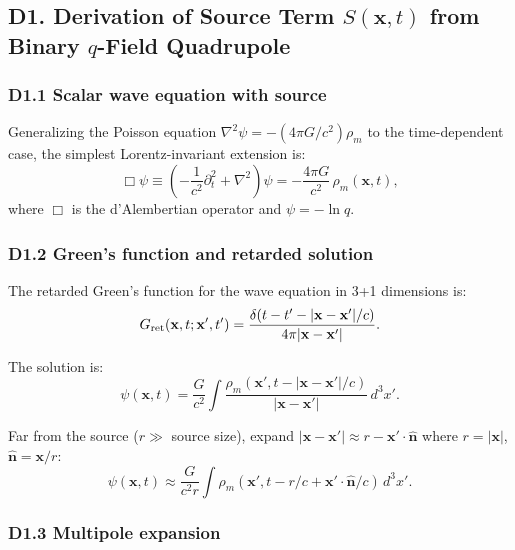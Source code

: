 \documentclass[reprint]{revtex4-2}
\begin{document}
\subsection{D1. Derivation of Source Term $S(\mathbf{x},t)$ from Binary $q$-Field Quadrupole}

\subsubsection{D1.1 Scalar wave equation with source}

Generalizing the Poisson equation $\nabla^2\psi = -(4\pi G/c^2)\rho_m$ to the time-dependent case, the simplest Lorentz-invariant extension is:
\begin{equation}
\Box\psi \equiv \left(-\frac{1}{c^2}\partial_t^2 + \nabla^2\right)\psi = -\frac{4\pi G}{c^2}\,\rho_m(\mathbf{x},t),
\label{eq:scalar_wave}
\end{equation}
where $\Box$ is the d'Alembertian operator and $\psi = -\ln q$.

\subsubsection{D1.2 Green's function and retarded solution}

The retarded Green's function for the wave equation in 3+1 dimensions is:
\begin{equation}
G_{\rm ret}(\mathbf{x},t;\mathbf{x}',t') = \frac{\delta(t - t' - |\mathbf{x}-\mathbf{x}'|/c)}{4\pi|\mathbf{x}-\mathbf{x}'|}.
\end{equation}

The solution is:
\begin{equation}
\psi(\mathbf{x},t) = \frac{G}{c^2}\int \frac{\rho_m(\mathbf{x}', t - |\mathbf{x}-\mathbf{x}'|/c)}{|\mathbf{x}-\mathbf{x}'|}\,d^3x'.
\end{equation}

Far from the source ($r \gg$ source size), expand $|\mathbf{x}-\mathbf{x}'| \approx r - \mathbf{x}'\cdot\hat{\mathbf{n}}$ where $r=|\mathbf{x}|$, $\hat{\mathbf{n}} = \mathbf{x}/r$:
\begin{equation}
\psi(\mathbf{x},t) \approx \frac{G}{c^2 r}\int \rho_m(\mathbf{x}', t - r/c + \mathbf{x}'\cdot\hat{\mathbf{n}}/c)\,d^3x'.
\end{equation}

\subsubsection{D1.3 Multipole expansion}
\end{document}
